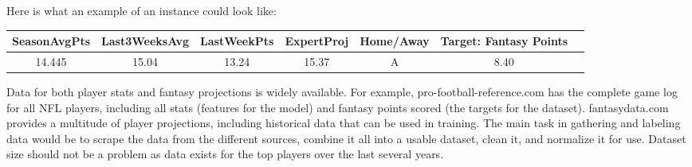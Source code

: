 \documentclass[10pt]{homework}
\begin{document}
Here is what an example of an instance could look like:

\begin{center}
    \begin{tabular}{ccccccc}
        SeasonAvgPts & Last3WeeksAvg & LastWeekPts & ExpertProj & Home/Away & Target: Fantasy Points \\
        \hline
        14.445 & 15.04 & 13.24 & 15.37 & A & 8.40
    \end{tabular}
\end{center}


Data for both player stats and fantasy projections is widely available. For example, pro-football-reference.com
has the complete game log for all NFL players, including all stats (features for the model) and fantasy points
scored (the targets for the dataset). fantasydata.com provides a multitude of player projections, including
historical data that can be used in training. The main task in gathering and labeling data would be to scrape
the data from the different sources, combine it all into a usable dataset, clean it, and normalize it for use.
Dataset size should not be a problem as data exists for the top players over the last several years.
\end{document}
